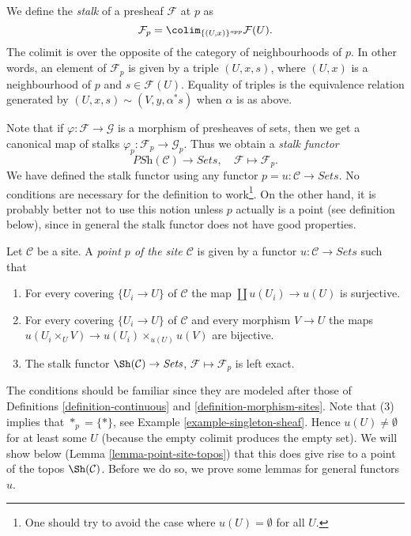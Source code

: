 \medskip\noindent
We define the {\it stalk} of a presheaf $\mathcal{F}$ at $p$ as
\begin{equation}
\label{equation-stalk}
\mathcal{F}_p = \colim_{\{(U, x)\}^{opp}} \mathcal{F}(U).
\end{equation}
The colimit is over the opposite of the category of
neighbourhoods of $p$. In other words, an element of
$\mathcal{F}_p$ is given by a triple $(U, x, s)$, where
$(U, x)$ is a neighbourhood of $p$ and $s \in \mathcal{F}(U)$. Equality
of triples is the equivalence relation generated by
$(U, x, s) \sim (V, y, \alpha^*s)$ when $\alpha$ is as above.

\medskip\noindent
Note that if $\varphi : \mathcal{F} \to \mathcal{G}$ is a morphism
of presheaves of sets, then we get a canonical map of stalks
$\varphi_p : \mathcal{F}_p \to \mathcal{G}_p$. Thus we obtain
a {\it stalk functor}
$$
\textit{PSh}(\mathcal{C}) \longrightarrow \textit{Sets}, \quad
\mathcal{F} \longmapsto \mathcal{F}_p.
$$
We have defined the stalk functor using any functor
$p = u : \mathcal{C} \to \textit{Sets}$. No conditions are
necessary for the definition to work\footnote{One should try to
avoid the case where $u(U) = \emptyset$ for all $U$.}. On the other hand,
it is probably better not to use this notion unless $p$
actually is a point (see definition below), since in general
the stalk functor does not have good properties.

\begin{definition}
\label{definition-point}
Let $\mathcal{C}$ be a site. A {\it point $p$ of the site
$\mathcal{C}$} is given by a functor $u : \mathcal{C}
\to \textit{Sets}$ such that
\begin{enumerate}
\item For every covering $\{U_i \to U\}$ of $\mathcal{C}$ the map
$\coprod u(U_i) \to u(U)$ is surjective.
\item For every covering $\{U_i \to U\}$ of $\mathcal{C}$ and
every morphism $V \to U$ the maps
$u(U_i \times_U V) \to u(U_i) \times_{u(U)} u(V)$ are bijective.
\item The stalk functor $\Sh(\mathcal{C}) \to \textit{Sets}$,
$\mathcal{F} \mapsto \mathcal{F}_p$ is left exact.
\end{enumerate}
\end{definition}

\noindent
The conditions should be familiar since they are modeled after those of
Definitions \ref{definition-continuous} and
\ref{definition-morphism-sites}.
Note that (3) implies that $*_p = \{*\}$, see
Example \ref{example-singleton-sheaf}. Hence $u(U) \not = \emptyset$
for at least some $U$ (because the empty colimit produces the
empty set). We will show below (Lemma \ref{lemma-point-site-topos})
that this does give rise
to a point of the topos $\Sh(\mathcal{C})$.
Before we do so, we prove some lemmas for general functors $u$.

